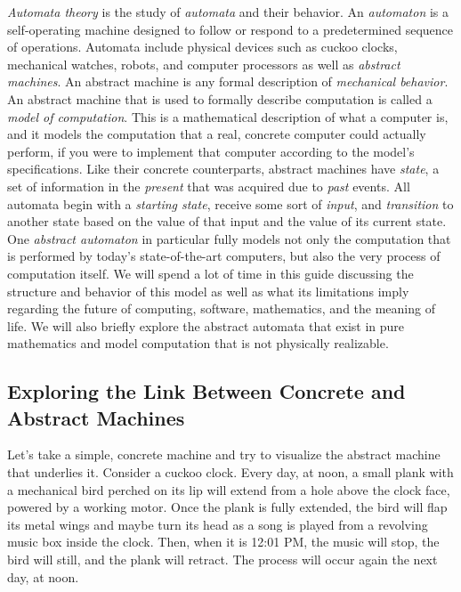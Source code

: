 \textit{Automata theory} is the study of \textit{automata} and their behavior. An \textit{automaton} is a self-operating machine designed to follow or respond to a predetermined sequence of operations. Automata include physical devices such as cuckoo clocks, mechanical watches, robots, and computer processors as well as \textit{abstract machines}. An abstract machine is any formal description of \textit{mechanical behavior}. An abstract machine that is used to formally describe computation is called a \textit{model of computation}. This is a mathematical description of what a computer is, and it models the computation that a real, concrete computer could actually perform, if you were to implement that computer according to the model's specifications. Like their concrete counterparts, abstract machines have \textit{state}, a set of information in the \textit{present} that was acquired due to \textit{past} events. All automata begin with a \textit{starting state}, receive some sort of \textit{input}, and \textit{transition} to another state based on the value of that input and the value of its current state. \\

One \textit{abstract automaton} in particular fully models not only the computation that is performed by today's state-of-the-art computers, but also the very process of computation itself. We will spend a lot of time in this guide discussing the structure and behavior of this model as well as what its limitations imply regarding the future of computing, software, mathematics, and the meaning of life. We will also briefly explore the abstract automata that exist in pure mathematics and model computation that is not physically realizable. \\



\subsection{Exploring the Link Between Concrete and Abstract Machines}

Let's take a simple, concrete machine and try to visualize the abstract machine that underlies it. Consider a cuckoo clock. Every day, at noon, a small plank with a mechanical bird perched on its lip will extend from a hole above the clock face, powered by a working motor. Once the plank is fully extended, the bird will flap its metal wings and maybe turn its head as a song is played from a revolving music box inside the clock. Then, when it is 12:01 PM, the music will stop, the bird will still, and the plank will retract. The process will occur again the next day, at noon. \\

